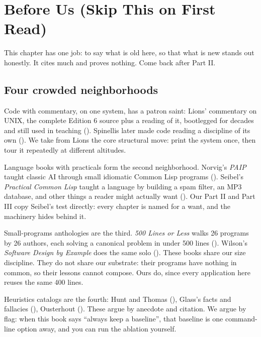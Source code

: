 \documentclass[
  justified]{tufte-book}
\begin{document}
\chapter{Before Us (Skip This on First
Read)}\label{before-us-skip-this-on-first-read}

This chapter has one job: to say what is old here, so that what is new
stands out honestly. It cites much and proves nothing. Come back after
Part II.

\section{Four crowded neighborhoods}\label{four-crowded-neighborhoods}

Code with commentary, on one system, has a patron saint: Lions'
commentary on UNIX, the complete Edition 6 source plus a reading of it,
bootlegged for decades and still used in teaching
(). Spinellis later made code reading
a discipline of its own (). We
take from Lions the core structural move: print the system once, then
tour it repeatedly at different altitudes.

Language books with practicals form the second neighborhood. Norvig's
\emph{PAIP} taught classic AI through small idiomatic Common Lisp
programs (). Seibel's
\emph{Practical Common Lisp} taught a language by building a spam
filter, an MP3 database, and other things a reader might actually want
(). Our Part II and Part III copy
Seibel's test directly: every chapter is named for a want, and the
machinery hides behind it.

Small-programs anthologies are the third. \emph{500 Lines or Less} walks
26 programs by 26 authors, each solving a canonical problem in under 500
lines (). Wilson's
\emph{Software Design by Example} does the same solo
(). These books share our size
discipline. They do not share our substrate: their programs have nothing
in common, so their lessons cannot compose. Ours do, since every
application here reuses the same 400 lines.

Heuristics catalogs are the fourth: Hunt and Thomas
(), Glass's facts and
fallacies (), Ousterhout
(). These argue by anecdote
and citation. We argue by flag: when this book says ``always keep a
baseline'', that baseline is one command-line option away, and you can
run the ablation yourself.
\end{document}
